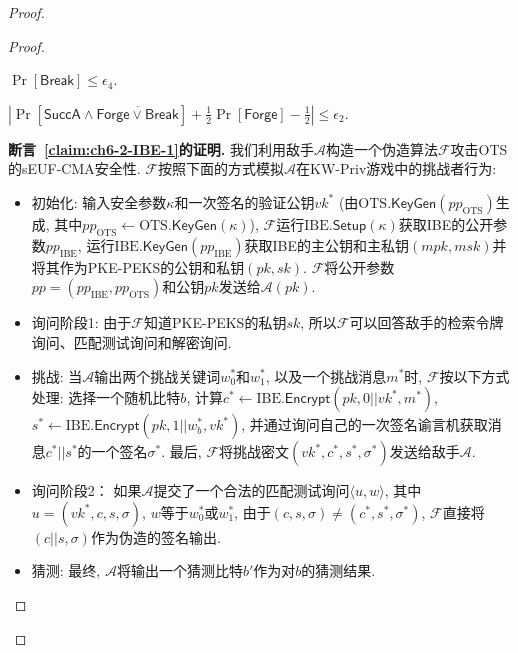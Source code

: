 \begin{proof}
\begin{proof}
\begin{claim}\label{claim:ch6-2-IBE-2}
	$\Pr[\mathsf{Break}] \leq \epsilon_4$. 
\end{claim}  

\begin{claim}\label{claim:ch6-2-IBE-3}
	$|\Pr[\mathsf{SuccA} \wedge \overline{\mathsf{Forge}\lor\mathsf{Break}}] + \frac{1}{2}\Pr[\mathsf{Forge}] - \frac{1}{2}| \leq \epsilon_2$.
\end{claim}

\begin{trivlist}
	\item \textbf{断言~\ref{claim:ch6-2-IBE-1}的证明.} 我们利用敌手$\mathcal{A}$构造一个伪造算法$\mathcal{F}$攻击OTS的sEUF-CMA安全性. 	$\mathcal{F}$按照下面的方式模拟$\mathcal{A}$在KW-Priv游戏中的挑战者行为: 
\begin{itemize}
\item 初始化: 输入安全参数$\kappa$和一次签名的验证公钥$vk^*$ (由$\text{OTS}.\mathsf{KeyGen}(pp_{\text{OTS}})$生成, 其中$pp_{\text{OTS}} \leftarrow \text{OTS}.\mathsf{KeyGen}(\kappa)$), 
		$\mathcal{F}$运行$\text{IBE}.\mathsf{Setup}(\kappa)$获取IBE的公开参数$pp_{\text{IBE}}$, 运行$\text{IBE}.\mathsf{KeyGen}(pp_{\text{IBE}})$获取IBE的主公钥和主私钥$(mpk, msk)$并将其作为PKE-PEKS的公钥和私钥$(pk, sk)$. $\mathcal{F}$将公开参数$pp = (pp_{\text{IBE}}, pp_{\text{OTS}})$和公钥$pk$发送给$\mathcal{A}(pk)$. 

\item 询问阶段1: 由于$\mathcal{F}$知道PKE-PEKS的私钥$sk$, 所以$\mathcal{F}$可以回答敌手的检索令牌询问、匹配测试询问和解密询问.  

\item 挑战: 当$\mathcal{A}$输出两个挑战关键词$w_0^*$和$w_1^*$, 以及一个挑战消息$m^*$时, $\mathcal{F}$按以下方式处理: 选择一个随机比特$b$, 计算$c^* \leftarrow \text{IBE}.\mathsf{Encrypt}(pk, 0||vk^*, m^*)$, $s^* \leftarrow \text{IBE}.\mathsf{Encrypt}(pk, 1||w_b^*, vk^*)$, 并通过询问自己的一次签名谕言机获取消息$c^*||s^*$的一个签名$\sigma^*$. 最后, $\mathcal{F}$将挑战密文$(vk^*, c^*, s^*, \sigma^*)$发送给敌手$\mathcal{A}$. 

\item 询问阶段2： 如果$\mathcal{A}$提交了一个合法的匹配测试询问$\langle u, w \rangle$, 其中$u = (vk^*, c, s, \sigma)$, $w$等于$w_0^*$或$w_1^*$, 由于$(c, s, \sigma) \neq (c^*, s^*, \sigma^*)$,  $\mathcal{F}$直接将$(c||s, \sigma)$作为伪造的签名输出.

\item 猜测: 最终, $\mathcal{A}$将输出一个猜测比特$b'$作为对$b$的猜测结果.
\end{itemize}


\end{trivlist}
\end{proof}
\end{proof}
